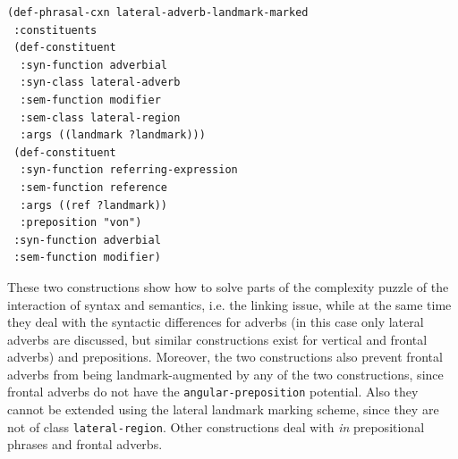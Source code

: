 \ea
\begin{footnotesize}
\begin{verbatim}
(def-phrasal-cxn lateral-adverb-landmark-marked
 :constituents
 (def-constituent
  :syn-function adverbial
  :syn-class lateral-adverb 
  :sem-function modifier
  :sem-class lateral-region
  :args ((landmark ?landmark)))
 (def-constituent
  :syn-function referring-expression
  :sem-function reference
  :args ((ref ?landmark))
  :preposition "von")
 :syn-function adverbial
 :sem-function modifier)
\end{verbatim}
\end{footnotesize}
\label{e:lateral-adverb-landmark-marked}
\z


These two constructions show how to solve parts of the  
complexity puzzle of the interaction of syntax and semantics, 
i.e. the linking issue, while at the same time they deal with the syntactic 
differences for adverbs (in this case only lateral adverbs are discussed, 
but similar constructions exist for vertical and frontal adverbs) and 
prepositions. Moreover, the two constructions also 
prevent frontal adverbs from being 
landmark-augmented by any of the two constructions, 
since frontal adverbs do not have
the {\footnotesize\tt angular-preposition} potential. Also they 
cannot be extended using the lateral 
landmark marking scheme, since they are not of class 
{\footnotesize\tt lateral-region}. Other constructions deal with 
\textit{in} prepositional phrases and frontal adverbs.

